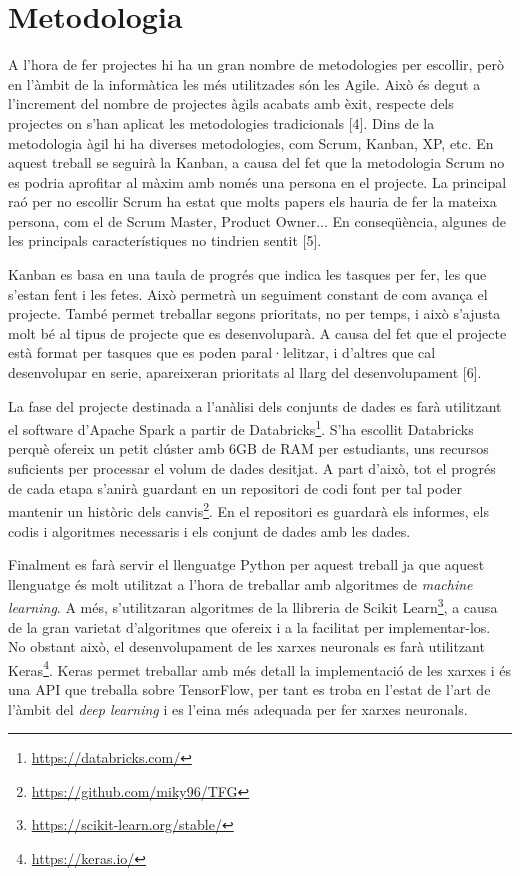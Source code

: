 \documentclass[10pt,a4paper,twocolumn,twoside]{article}
\begin{document}
\section {Metodologia}
A l'hora de fer projectes hi ha un gran nombre de metodologies per escollir, però en l'àmbit de la informàtica les més utilitzades són les Agile. Això és degut a l'increment del nombre de projectes àgils acabats amb èxit, respecte dels projectes on s'han aplicat les metodologies tradicionals [4]. Dins de la metodologia àgil hi ha diverses metodologies, com Scrum, Kanban, XP, etc. En aquest treball se seguirà la Kanban, a causa del fet que la metodologia Scrum no es podria aprofitar al màxim amb només una persona en el projecte. La principal raó per no escollir Scrum ha estat que molts papers els hauria de fer la mateixa persona, com el de Scrum Master, Product Owner... En conseqüència, algunes de les principals característiques no tindrien sentit [5].

Kanban es basa en una taula de progrés que indica les tasques per fer, les que s'estan fent i les fetes. Això permetrà un seguiment constant de com avança el projecte. També permet treballar segons prioritats, no per temps, i això s'ajusta molt bé al tipus de projecte que es desenvoluparà. A causa del fet que el projecte està format per tasques que es poden paral·lelitzar, i d'altres que cal desenvolupar en serie, apareixeran prioritats al llarg del desenvolupament [6].

La fase del projecte destinada a l'anàlisi dels conjunts de dades es farà utilitzant el software d'Apache Spark a partir de Databricks\footnote{\url{https://databricks.com/}}. S'ha escollit Databricks perquè ofereix un petit clúster amb 6GB de RAM per estudiants, uns recursos suficients per processar el volum de dades desitjat.
A part d'això, tot el progrés de cada etapa s'anirà guardant en un repositori de codi font per tal poder mantenir un històric dels canvis\footnote{\url{ https://github.com/miky96/TFG}}. En el repositori es guardarà els informes, els codis i algoritmes necessaris i els conjunt de dades amb les dades.

Finalment es farà servir el llenguatge Python per aquest treball ja que aquest llenguatge és molt utilitzat a l'hora de treballar amb algoritmes de \textit{machine learning}. A més, s'utilitzaran algoritmes de la llibreria de Scikit Learn\footnote{\url{https://scikit-learn.org/stable/}}, a causa de la gran varietat d'algoritmes que ofereix i a la facilitat per implementar-los. No obstant això, el desenvolupament de les xarxes neuronals es farà utilitzant Keras\footnote{\url{https://keras.io/}}. Keras permet treballar amb més detall la implementació de les xarxes i és una API que treballa sobre TensorFlow, per tant es troba en l'estat de l'art de l'àmbit del \textit{deep learning} i es l'eina més adequada per fer xarxes neuronals.
\end{document}
